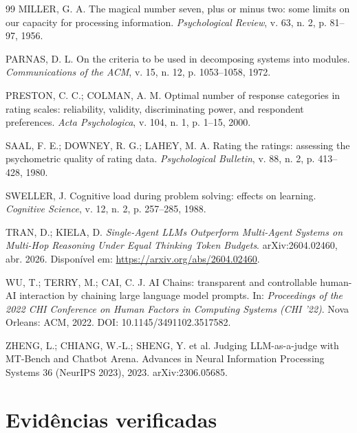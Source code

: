 \documentclass[11pt,a4paper]{article}
\begin{document}
\begin{thebibliography}{99}
MILLER, G. A. The magical number seven, plus or minus two: some limits on our capacity for processing
information. \textit{Psychological Review}, v. 63, n. 2, p. 81--97, 1956.

PARNAS, D. L. On the criteria to be used in decomposing systems into modules.
\textit{Communications of the ACM}, v. 15, n. 12, p. 1053--1058, 1972.

PRESTON, C. C.; COLMAN, A. M. Optimal number of response categories in rating scales: reliability, validity,
discriminating power, and respondent preferences. \textit{Acta Psychologica}, v. 104, n. 1, p. 1--15, 2000.

SAAL, F. E.; DOWNEY, R. G.; LAHEY, M. A. Rating the ratings: assessing the psychometric quality of rating
data. \textit{Psychological Bulletin}, v. 88, n. 2, p. 413--428, 1980.

SWELLER, J. Cognitive load during problem solving: effects on learning.
\textit{Cognitive Science}, v. 12, n. 2, p. 257--285, 1988.

TRAN, D.; KIELA, D.
\textit{Single-Agent LLMs Outperform Multi-Agent Systems on Multi-Hop Reasoning Under Equal Thinking Token
Budgets}. arXiv:2604.02460, abr. 2026. Disponível em: \url{https://arxiv.org/abs/2604.02460}.

WU, T.; TERRY, M.; CAI, C. J. AI Chains: transparent and controllable human-AI interaction by chaining
large language model prompts. In: \textit{Proceedings of the 2022 CHI Conference on Human Factors in
Computing Systems (CHI '22)}. Nova Orleans: ACM, 2022. DOI: 10.1145/3491102.3517582.

ZHENG, L.; CHIANG, W.-L.; SHENG, Y. et al. Judging LLM-as-a-judge with MT-Bench and Chatbot Arena.
Advances in Neural Information Processing Systems 36 (NeurIPS 2023), 2023. arXiv:2306.05685.

\end{thebibliography}

\appendix
\section{Evidências verificadas}
\end{document}
